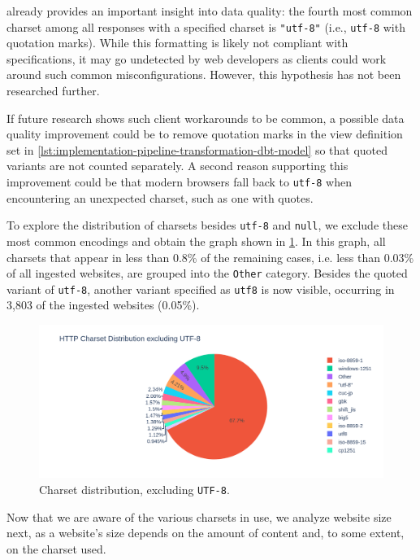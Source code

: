  already provides an important insight into data quality: the fourth most common charset among all responses with a specified charset is \texttt{"utf-8"} (i.e., \texttt{utf-8} with quotation marks).
While this formatting is likely not compliant with specifications, it may go undetected by web developers as clients could work around such common misconfigurations.
However, this hypothesis has not been researched further.

If future research shows such client workarounds to be common, a possible data quality improvement could be to remove quotation marks in the view definition set in \cref{lst:implementation-pipeline-transformation-dbt-model} so that quoted variants are not counted separately.
A second reason supporting this improvement could be that modern browsers fall back to \texttt{utf-8} when encountering an unexpected charset, such as one with quotes.

To explore the distribution of charsets besides \texttt{utf-8} and \texttt{null}, we exclude these most common encodings and obtain the graph shown in \cref{fig:analysis-dataset-chart_source_charset_pie_excluding_utf8}.
In this graph, all charsets that appear in less than 0.8\% of the remaining cases, i.e. less than 0.03\% of all ingested websites, are grouped into the \texttt{Other} category.
Besides the quoted variant of \texttt{utf-8}, another variant specified as \texttt{utf8} is now visible, occurring in 3,803 of the ingested websites (0.05\%).

\begin{figure}[H]
    \centering
    \includegraphics[width=\textwidth]{figures/charts/large/chart_source_charset_pie_excluding_utf8.png}
    \caption{Charset distribution, excluding \texttt{UTF-8}.}
    \label{fig:analysis-dataset-chart_source_charset_pie_excluding_utf8}
\end{figure}

Now that we are aware of the various charsets in use, we analyze website size next, as a website's size depends on the amount of content and, to some extent, on the charset used.

